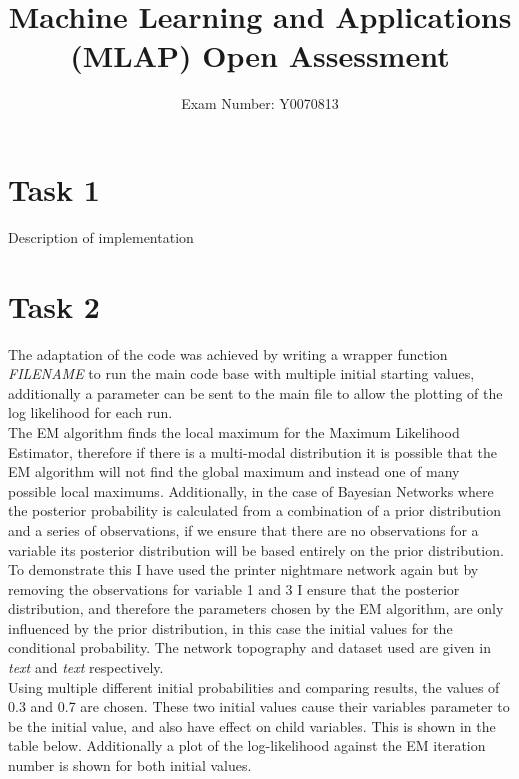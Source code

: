 \documentclass{article}
\begin{document}
\title{Machine Learning and Applications (MLAP) Open Assessment}
\author{Exam Number: Y0070813}
\maketitle
\section{Task 1}
Description of implementation
\section{Task 2}
The adaptation of the code was achieved by writing a wrapper function \textit{FILENAME} to run the main code base with multiple initial starting values, additionally a parameter can be sent to the main file to allow the plotting of the log likelihood for each run. \\ 
The EM algorithm finds the local maximum for the Maximum Likelihood Estimator, therefore if there is a multi-modal distribution it is possible that the EM algorithm will not find the global maximum and instead one of many possible local maximums. Additionally, in the case of Bayesian Networks where the posterior probability is calculated from a combination of a prior distribution and a series of observations, if we ensure that there are no observations for a variable its posterior distribution will be based entirely on the prior distribution. To demonstrate this I have used the printer nightmare network again but by removing the observations for variable 1 and 3 I ensure that the posterior distribution, and therefore the parameters chosen by the EM algorithm, are only influenced by the prior distribution, in this case the initial values for the conditional probability. The network topography and dataset used are given in \textit{text} and \textit{text} respectively. \\
Using multiple different initial probabilities and comparing results, the values of 0.3 and 0.7 are chosen. These two initial values cause their variables parameter to be the initial value, and also have effect on child variables. This is shown in the table below. Additionally a plot of the log-likelihood against the EM iteration number is shown for both initial values.
\end{document}
